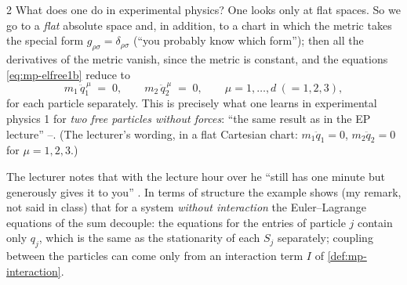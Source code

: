 \begin{paracol}{2}
What does one do in experimental physics? One looks only at flat spaces. So we go to a \emph{flat} absolute space and, in addition, to a chart in which the metric takes the special form $g_{\rho\sigma}=\delta_{\rho\sigma}$ (``you probably know which form''); then all the derivatives of the metric vanish, since the metric is constant, and the equations \eqref{eq:mp-elfree1b} reduce to
\begin{equation}\label{eq:mp-newton}
  m_1\,\ddot q_1^{\,\mu}\;=\;0,\qquad m_2\,\ddot q_2^{\,\mu}\;=\;0,\qquad\mu=1,\dots,d\ (=1,2,3),
\end{equation}
for each particle separately. This is precisely what one learns in experimental physics 1 for \emph{two free particles without forces}: ``the same result as in the EP lecture'' --. (The lecturer's wording, in a flat Cartesian chart: $m_1\ddot q_1=0$, $m_2\ddot q_2=0$ for $\mu=1,2,3$.)

\begin{coursenote}\label{cn:mp-end}
The lecturer notes that with the lecture hour over he ``still has one minute but generously gives it to you'' . In terms of structure the example shows (my remark, not said in class) that for a system \emph{without interaction} the Euler--Lagrange equations of the sum decouple: the equations for the entries of particle $j$ contain only $q_j$, which is the same as the stationarity of each $S_j$ separately; coupling between the particles can come only from an interaction term $I$ of \cref{def:mp-interaction}.
\end{coursenote}


\end{paracol}

